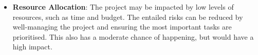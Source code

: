 \begin{itemize}
\begin{itemize}
                \item \textbf{Resource Allocation}: The project may be impacted by low levels of resources, such as time and budget. The entailed risks can be reduced by well-managing the project and ensuring the most important tasks are prioritised. This also has a moderate chance of happening, but would have a high impact.
            \end{itemize}
    \end{itemize}
    